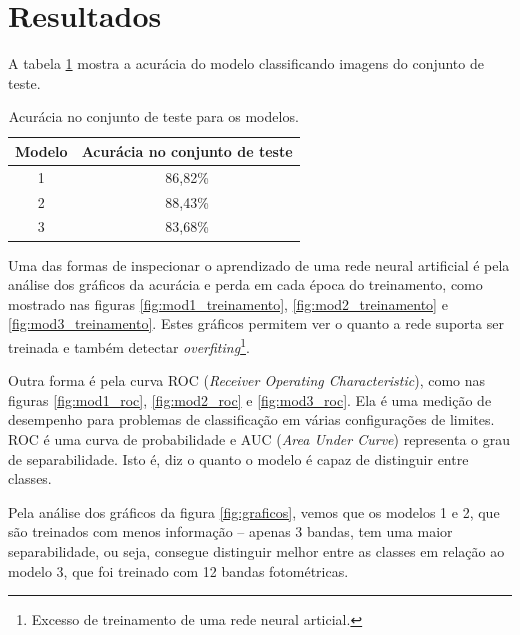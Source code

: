 \section{Resultados}

A tabela \ref{tab:eval} mostra a acurácia do modelo classificando imagens do conjunto de teste.

\begin{table}[h!]
  \centering

  \caption{Acurácia no conjunto de teste para os modelos.}
  \label{tab:eval}

  \begin{tabular}{cc}
    \toprule
    Modelo & Acurácia no conjunto de teste \\
    \midrule
    1      & 86,82\%                       \\
    2      & 88,43\%                       \\
    3      & 83,68\%                       \\
    \bottomrule
  \end{tabular}
\end{table}


Uma das formas de inspecionar o aprendizado de uma rede neural artificial é pela análise dos gráficos da acurácia e perda em cada época do treinamento, como mostrado nas figuras \ref{fig:mod1_treinamento}, \ref{fig:mod2_treinamento} e \ref{fig:mod3_treinamento}. Estes gráficos permitem ver o quanto a rede suporta ser treinada e também detectar \emph{overfiting}\footnote{Excesso de treinamento de uma rede neural articial.}.

Outra forma é pela curva ROC (\emph{Receiver Operating Characteristic}), como nas figuras \ref{fig:mod1_roc}, \ref{fig:mod2_roc} e \ref{fig:mod3_roc}. Ela é uma medição de desempenho para problemas de classificação em várias configurações de limites. ROC é uma curva de probabilidade e AUC (\emph{Area Under Curve}) representa o grau de separabilidade. Isto é, diz o quanto o modelo é capaz de distinguir entre classes. \cite{Fawcett2006,Hanley1982}

Pela análise dos gráficos da figura \ref{fig:graficos}, vemos que os modelos 1 e 2, que são treinados com menos informação -- apenas 3 bandas, tem uma maior separabilidade, ou seja, consegue distinguir melhor entre as classes em relação ao modelo 3, que foi treinado com 12 bandas fotométricas.

\afterpage{\clearpage}

